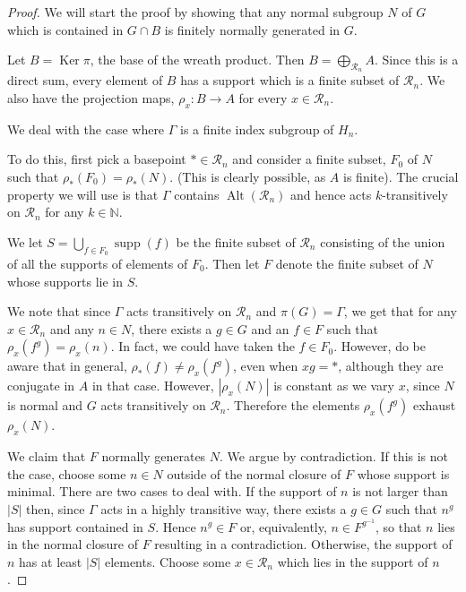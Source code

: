 \documentclass[10pt,a4paper]{amsart}
\newcommand{\Alt}{\operatorname{Alt}}
\newcommand{\N}{\mathbb N}
\newcommand{\Ra}{\mathcal{R}}
\renewcommand{\ker}{\operatorname{Ker}}
\newcommand{\supp}{\operatorname{supp}}
\begin{document}
\begin{proof} 
	
We will start the proof by showing that any normal subgroup $N$ of $G$ which is contained in $G \cap B $ is finitely normally generated in $G$. 

	
	Let $B=\ker \pi$, the base of the wreath product. Then $B = \bigoplus_{\Ra_n} A$. Since this is a direct sum, every element of $B$ has a support which is a finite subset of $\Ra_n$. We also have the projection maps, $\rho_x: B \to A$ for every $x \in \Ra_n$.


	We deal with the case where $\Gamma$ is a finite index subgroup of $H_n$. 


To do this, first pick a basepoint $* \in \Ra_n$ and consider a finite subset, $F_0$ of $N$ such that $\rho_*(F_0) = \rho_*(N)$. (This is clearly possible, as $A$ is finite). 
The crucial property we will use is that $\Gamma$ contains $\Alt(\Ra_n)$ and hence acts $k$-transitively on $\Ra_n$ for any $k \in \N$. 


We let $S = \bigcup_{f \in F_0} \supp(f)$ be the finite subset of $\Ra_n$ consisting of the union of all the supports of elements of $F_0$. Then let $F$ denote the finite subset of $N$ whose supports lie in $S$. 

We note that since $\Gamma$ acts transitively on $\Ra_n$ and $\pi(G) = \Gamma$, we get that for any $x \in \Ra_n$ and any $n \in N$, there exists a $g \in G$ and an $ f \in F$ such that $\rho_x(f^g) = \rho_x(n)$. In fact, we could have taken the $f \in F_0$. However, do be aware that in general, $\rho_*(f) \neq \rho_x(f^g)$, even when $xg=*$, although they are conjugate in $A$ in that case. However, $|\rho_x(N)|$ is constant as we vary $x$, since $N$ is normal and $G$ acts transitively on $\Ra_n$. Therefore the elements $\rho_x(f^g)$ exhaust $\rho_x(N)$.  

We claim that $F$ normally generates $N$. We argue by contradiction. If this is not the case, choose some $n \in N$ outside of the normal closure of $F$ whose support is minimal. There are two cases to deal with. If the support of $n$ is not larger than $|S|$ then, since $\Gamma$ acts in a highly transitive way, there exists a $g \in G$ such that $n^g$ has support contained in $S$. Hence $n^g \in F$ or, equivalently, $n \in F^{g^{-1}}$, so that $n$ lies in the normal closure of $F$ resulting in a contradiction. Otherwise, the support of $n$ has at least $|S|$ elements. Choose some $x \in \Ra_n$ which lies in the support of $n$. 



\end{proof}
\end{document}
